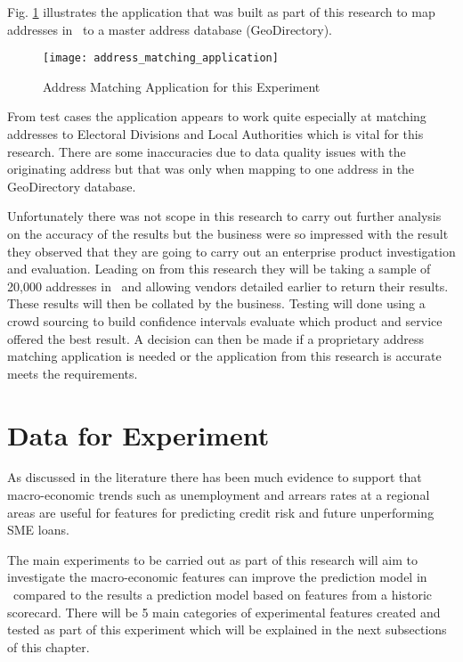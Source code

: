 Fig. \ref{fig:address_matching_application} illustrates the application that was built as part of this research to map addresses in \subjectname\ to a master address database (GeoDirectory).

\begin{figure}[H]
	\texttt{[image: address\_matching\_application]}
	\caption{Address Matching Application for this Experiment}
	\label{fig:address_matching_application}
\end{figure}

From test cases the application appears to work quite especially at matching addresses to Electoral Divisions and Local Authorities which is vital for this research. There are some inaccuracies due to data quality issues with the originating address but that was only when mapping to one address in the GeoDirectory database.

Unfortunately there was not scope in this research to carry out further analysis on the accuracy of the results but the business were so impressed with the result they observed that they are going to carry out an enterprise product investigation and evaluation. Leading on from this research they will be taking a sample of 20,000 addresses in \subjectname\ and allowing vendors detailed earlier to return their results. These results will then be collated by the business. Testing will done using a crowd sourcing to build confidence intervals evaluate which product and service offered the best result. A decision can then be made if a proprietary address matching application is needed or the application from this research is accurate meets the requirements.  


\section{Data for Experiment}
As discussed in the literature there has been much evidence to support that macro-economic trends such as unemployment and arrears rates at a regional areas are useful for features for predicting credit risk and future unperforming SME loans.

The main experiments to be carried out as part of this research will aim to investigate the macro-economic features can improve the prediction model in \subjectname\ compared to the results a prediction model based on features from a historic scorecard. There will be 5 main categories of experimental features created and tested as part of this experiment which will be explained in the next subsections of this chapter. 

